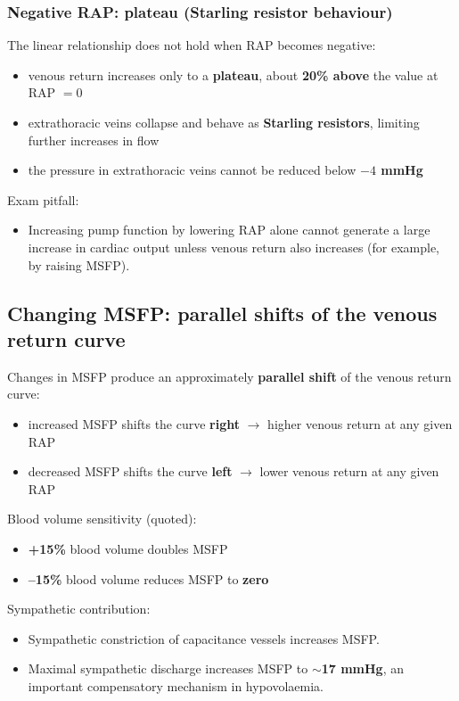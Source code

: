 \documentclass[11pt,a4paper]{article}
\begin{document}
\subsubsection{Negative RAP: plateau (Starling resistor behaviour)}
The linear relationship does not hold when RAP becomes negative:
\begin{itemize}
\item venous return increases only to a \textbf{plateau}, about \textbf{20\% above} the value at RAP $=0$
\item extrathoracic veins collapse and behave as \textbf{Starling resistors}, limiting further increases in flow
\item the pressure in extrathoracic veins cannot be reduced below \textbf{$-4$ mmHg}
\end{itemize}
Exam pitfall:
\begin{itemize}
\item Increasing pump function by lowering RAP alone cannot generate a large increase in cardiac output unless venous return also increases (for example, by raising MSFP).
\end{itemize}

\subsection{Changing MSFP: parallel shifts of the venous return curve}
Changes in MSFP produce an approximately \textbf{parallel shift} of the venous return curve:
\begin{itemize}
\item increased MSFP shifts the curve \textbf{right} $\rightarrow$ higher venous return at any given RAP
\item decreased MSFP shifts the curve \textbf{left} $\rightarrow$ lower venous return at any given RAP
\end{itemize}

Blood volume sensitivity (quoted):
\begin{itemize}
\item \textbf{+15\%} blood volume doubles MSFP
\item \textbf{--15\%} blood volume reduces MSFP to \textbf{zero}
\end{itemize}

Sympathetic contribution:
\begin{itemize}
\item Sympathetic constriction of capacitance vessels increases MSFP.
\item Maximal sympathetic discharge increases MSFP to \textbf{$\sim$17 mmHg}, an important compensatory mechanism in hypovolaemia.
\end{itemize}
\end{document}
